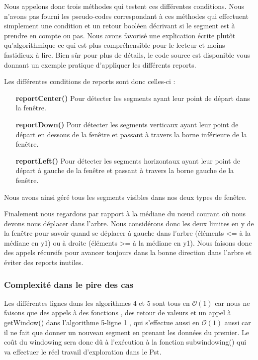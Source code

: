 \documentclass[10pt,a4paper]{article}
\begin{document}
Nous appelons donc trois méthodes qui testent ces différentes conditions. Nous n'avons pas fourni les pseudo-codes correspondant à ces méthodes qui effectuent simplement une condition et un retour booléen décrivant si le segment est à prendre en compte ou pas. Nous avons favorisé une explication écrite plutôt qu'algorithmique ce qui est plus compréhensible pour le lecteur et moins fastidieux à lire. Bien sûr pour plus de détails, le code source est disponible vous donnant un exemple pratique d'appliquer les différents reports.

Les différentes conditions de reports sont donc celles-ci :\begin{itemize}
\item[\textbf{reportCenter()}] Pour détecter les segments ayant leur point de départ dans la fenêtre.

\item[\textbf{reportDown()}] Pour détecter les segments verticaux ayant leur point de départ en dessous de la fenêtre et passant à travers la borne inférieure de la fenêtre.

\item[\textbf{reportLeft()}] Pour détecter les segments horizontaux ayant leur point de départ à gauche de la fenêtre et passant à travers la borne gauche de la fenêtre.

\end{itemize}
Nous avons ainsi géré tous les segments visibles dans nos deux types de fenêtre.

Finalement nous regardons par rapport à la médiane du nœud courant où nous devons nous déplacer dans l'arbre. Nous considérons donc les deux limites en y de la fenêtre pour savoir quand se déplacer à gauche dans l'arbre (éléments <= à la médiane en y1) ou à droite (éléments >= à la médiane en y1). Nous faisons donc des appels récursifs pour avancer toujours dans la bonne direction dans l'arbre et éviter des reports inutiles.

\subsubsection{Complexité dans le pire des cas}

Les différentes lignes dans les algorithmes 4 et 5 sont tous en $\mathcal{O}(1)$ car nous ne faisons que des appels à des fonctions , des retour de valeurs et un appel à getWindow() dans l'algorithme 5-ligne 1 , qui s'effectue aussi en $\mathcal{O}(1)$ aussi car il ne fait que donner un nouveau segment en prenant les données du premier. Le coût du windowing sera donc dû à l’exécution à la fonction subwindowing() qui va effectuer le réel travail d'exploration dans le Pst.
\end{document}
